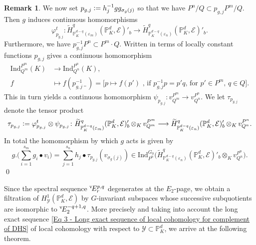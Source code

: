 \documentclass[a4paper, reqno, 10pt]{amsart}
\theoremstyle{definition}
\newtheorem{remark}[theorem]{Remark}
\numberwithin{equation}{section}
\newcommand{\blank}{{\,\_\,}}
\newcommand{\botimes}[1]{{\,\otimes_{#1}\,}}
\newcommand{\defeq}{\vcentcolon=}
\newcommand{\Ind}{{\mathrm{Ind}}}
\newcommand{\lra}{\longrightarrow}
\newcommand{\lto}{\longmapsto}
\newcommand{\mto}{\mapsto}
\newcommand{\ra}{\rightarrow}
\newcommand{\BP}{{\mathbb {P}}}
\newcommand{\CE}{{\mathcal {E}}}
\newcommand{\CY}{{\mathcal {Y}}}
\begin{document}
\begin{remark}
	
	We now set $p_{g,j} \defeq h^{-1}_j g g_{\sigma_g(j)}$ so that we have $ P^n/Q \subset p_{g,j} P^m/Q$.
	Then $g$ induces continuous homomorphisms
	\begin{equation*}
		\varphi_{p_{g,j}}^t \colon \widetilde{H}^{q}_{\BP_K^{d-q}(\varepsilon_m)} (\BP_K^d, \CE)'_b  \lra  \widetilde{H}^{q}_{\BP_K^{d-q}(\varepsilon_n)} (\BP_K^d, \CE)'_b .
	\end{equation*}
	Furthermore, we have $p_{g,j}^{-1} P^n \subset P^m \cdot Q$.
	Written in terms of locally constant functions $p_{g,j}$ gives a continuous homomorphism
	\begin{align*}
		\Ind^{P^m}_{Q^m} (K) &\lra \Ind^{P^n}_{Q^n} (K) , \\
		f &\lto f(p_{g,j}^{-1} \blank ) = \big[ p \mto f(p') \text{ , if $p_{g,j}^{-1} p = p' q$, for $p'\in P^m$, $q\in Q$}\big] .
	\end{align*}
	This in turn yields a continuous homomorphism $\psi_{p_{g,j}} \colon v^{P^m}_{Q^m} \ra v^{P^n}_{Q^n}$.
	We let $\tau_{p_{g,j}}$ denote the tensor product
	\begin{equation*}
		\tau_{p_{g,j}} \defeq \varphi^t_{p_{g,j}} \otimes \psi_{p_{g,j}} \colon \widetilde{H}^{q}_{\BP_K^{d-q}(\varepsilon_m)} (\BP_K^d, \CE)'_b \botimes{K} v^{P^m}_{Q^m} \lra  \widetilde{H}^{q}_{\BP_K^{d-q}(\varepsilon_n)} (\BP_K^d, \CE)'_b \botimes{K} v^{P^n}_{Q^n} .
	\end{equation*}
	In total the homomorphism by which $g$ acts is given by
	\begin{equation*}
		g .\bigg( \sum_{i=1}^{s_m} g_i \bullet v_i \bigg) = \sum_{j=1}^{s_n} h_j \bullet \tau_{p_{g,j}} (v_{\sigma_g(j)})
		\in \Ind^{G_0}_{P^n} \Big( \widetilde{H}^{q}_{\BP_K^{d-q}(\varepsilon_n)} (\BP_K^d, \CE)'_b \otimes_K v^{P^n}_{Q^n} \Big) .
	\end{equation*}
	\qed
\end{remark}




Since the spectral sequence ${}^{\rm v}\! E_r^{p,q}$ degenerates at the $E_2$-page, we obtain a filtration of $H^1_\CY (\BP_K^d, \CE)$ by $G$-invariant subspaces whose successive subquotients are isomorphic to ${}^{\rm v}\! E_2^{-q+1,q}$.
More precisely and taking into account the long exact sequence \eqref{Eq 3 - Long exact sequence of local cohomology for complement of DHS} of local cohomology with respect to $\CY \subset \BP_K^d$, we arrive at the following theorem.
\end{document}
